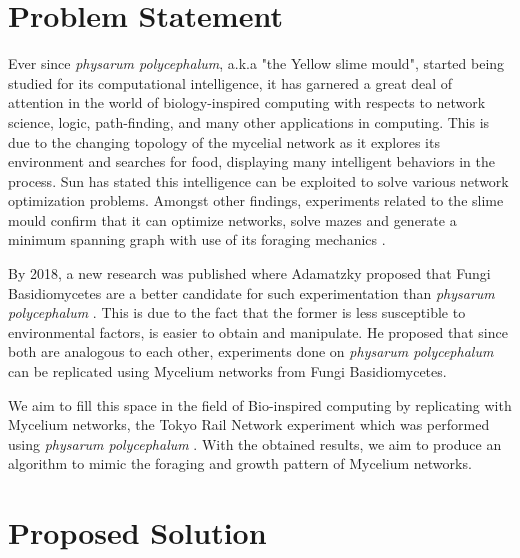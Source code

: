\section{Problem Statement}

Ever since \textit{physarum polycephalum}, a.k.a "the Yellow slime mould", started being studied for its computational intelligence, it has garnered a great deal of attention in the world of biology-inspired computing with respects to network science, logic, path-finding, and many other applications in computing. This is due to the changing topology of the mycelial network as it explores its environment and searches for food, displaying many intelligent behaviors in the process. Sun has stated this intelligence can be exploited to solve various network optimization problems. Amongst other findings, experiments related to the slime mould confirm that it can optimize networks, solve mazes and generate a minimum spanning graph with use of its foraging mechanics \cite{rulesBioDesign} \cite{mazesolving}.

By 2018, a new research was published where Adamatzky proposed that Fungi Basidiomycetes are a better candidate for such experimentation than \textit{physarum polycephalum} \cite{fungalcomp} . This is due to the fact that the former is less susceptible to environmental factors, is easier to obtain and manipulate. He proposed that since both are analogous to each other, experiments done on \textit{physarum polycephalum} can be replicated using Mycelium networks from Fungi Basidiomycetes.

We aim to fill this space in the field of Bio-inspired computing by replicating with Mycelium networks, the Tokyo Rail Network experiment which was performed using \textit{physarum polycephalum} \cite{rulesBioDesign}. With the obtained results, we aim to produce an algorithm to mimic the foraging and growth pattern of Mycelium networks.

\section{Proposed Solution}


